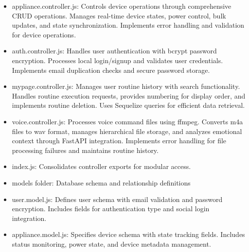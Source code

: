 \documentclass[conference]{IEEEtran}
\begin{document}
\begin{enumerate}[label=\arabic*]
\begin{itemize}[label=-]
        \item appliance.controller.js: Controls device operations through comprehensive CRUD operations. Manages real-time device states, power control, bulk updates, and state synchronization. Implements error handling and validation for device operations.
        \vspace{0.7em}

        \item auth.controller.js: Handles user authentication with bcrypt password encryption. Processes local login/signup and validates user credentials. Implements email duplication checks and secure password storage.
        \vspace{0.7em}

        \item mypage.controller.js: Manages user routine history with search functionality. Handles routine execution requests, provides numbering for display order, and implements routine deletion. Uses Sequelize queries for efficient data retrieval.
        \vspace{0.7em}

        \item voice.controller.js: Processes voice command files using ffmpeg. Converts m4a files to wav format, manages hierarchical file storage, and analyzes emotional context through FastAPI integration. Implements error handling for file processing failures and maintains routine history.
        \vspace{0.7em}

        \item index.js: Consolidates controller exports for modular access.
        \vspace{0.7em}

        \item models folder: Database schema and relationship definitions
        \vspace{0.7em}

        \item user.model.js: Defines user schema with email validation and password encryption. Includes fields for authentication type and social login integration.
        \vspace{0.7em}

        \item appliance.model.js: Specifies device schema with state tracking fields. Includes status monitoring, power state, and device metadata management.
        \vspace{0.7em}


\end{itemize}
\end{enumerate}
\end{document}
